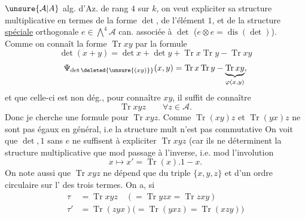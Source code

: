 $\unsure{\mathcal{A}|A}$ alg. d'Az. de rang $4$ sur $k$, on veut expliciter sa structure multiplicative en termes de la forme $\det$, de l'élément $1$, et de la structure \uline{spéciale} orthogonale $e\in\bigwedge^4\mathcal{A}$ can.  associée à $\det$ ($e\otimes e=\operatorname{dis}(\det)$).
Comme on connaît la forme $\operatorname{Tr}xy$ par la formule
\[
\det(x+y)=\det x+\det y+\operatorname{Tr}x\operatorname{Tr}y-\operatorname{Tr}xy
\]
\[
\Psi_{\det\deleted{\unsure{(xy)}}}(x,y)=\operatorname{Tr}x\operatorname{Tr}y-\underbrace{\operatorname{Tr}xy}_{\varphi(x,y)},
\]
 et que celle-ci est non dég., pour connaître $xy$, il suffit de connaître
\[
\operatorname{Tr}xyz\qquad\forall z\in\mathcal{A}.
\]
Donc je cherche une formule pour $\operatorname{Tr}xyz$. Comme $\operatorname{Tr}(xy)z$ et $\operatorname{Tr}(yx)z$ ne sont pas égaux en général, i.e la structure mult n'est pas commutative  On voit que $\det,1$ sans $e$ ne suffisent à expliciter $\operatorname{Tr}xyz$ (car ils ne déterminent la structure multiplicative que mod passage à l'inverse, i.e. mod l'involution
\[
x\longmapsto x'=\operatorname{Tr}(x).1-x.
\]
On note aussi que $\operatorname{Tr}xyz$ ne dépend que du triple $\{x,y,z\}$ et d'un ordre circulaire sur l' des trois termes. On a,  si
\[
\begin{aligned}
\tau&=\operatorname{Tr}xyz\quad(=\operatorname{Tr}yzx=\operatorname{Tr}zxy)\\
\tau'&=\operatorname{Tr}(zyx)\bigl(=\operatorname{Tr}(yxz)=\operatorname{Tr}(xzy)\bigr)
\end{aligned}
\]

